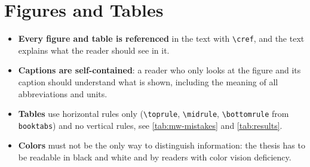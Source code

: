 \section{Figures and Tables}\label{sec:mw-figures}

\begin{itemize}
    \item \textbf{Every figure and table is referenced} in the text with
          \lstinline|\cref|, and the text explains what the reader should
          see in it.
    \item \textbf{Captions are self-contained}: a reader who only looks at
          the figure and its caption should understand what is shown,
          including the meaning of all abbreviations and units.
    \item \textbf{Tables} use horizontal rules only (\lstinline|\toprule|,
          \lstinline|\midrule|, \lstinline|\bottomrule| from
          \lstinline|booktabs|) and no vertical rules, see
          \cref{tab:mw-mistakes} and \cref{tab:results}.
    \item \textbf{Colors} must not be the only way to distinguish
          information: the thesis has to be readable in black and white and
          by readers with color vision deficiency.
\end{itemize}
